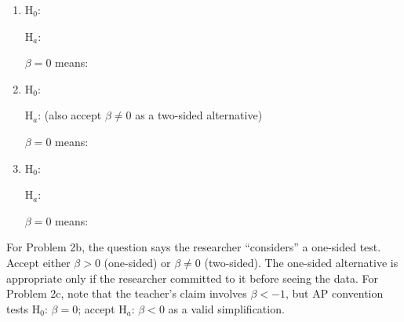 \documentclass[10pt]{article}
\begin{document}
\begin{enumerate}[label=\alph*.]

  \item H$_0$: 

        H$_a$: 

        $\beta = 0$ means: 

  \item H$_0$: 

        H$_a$: 
        (also accept $\beta \ne 0$ as a two-sided alternative)

        $\beta = 0$ means: 

  \item H$_0$: 

        H$_a$: 

        $\beta = 0$ means: 

\end{enumerate}

\begin{teachernote}
For Problem 2b, the question says the researcher ``considers'' a one-sided test.
Accept either $\beta > 0$ (one-sided) or $\beta \ne 0$ (two-sided). The one-sided
alternative is appropriate only if the researcher committed to it before seeing the
data. For Problem 2c, note that the teacher's claim involves $\beta < -1$, but AP
convention tests H$_0$: $\beta = 0$; accept H$_a$: $\beta < 0$ as a valid simplification.
\end{teachernote}
\end{document}
